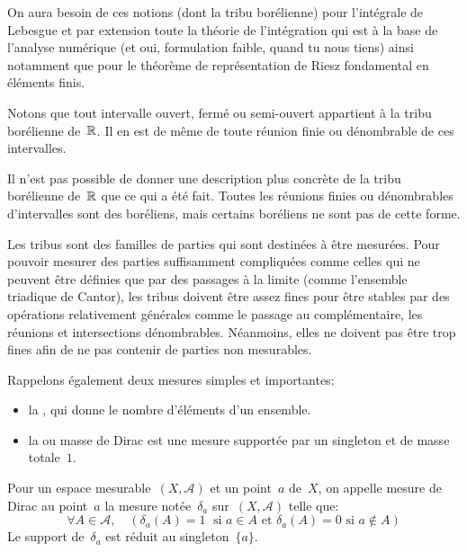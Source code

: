 On aura besoin de ces notions (dont la tribu borélienne) pour l'intégrale de Lebesgue et par extension toute la théorie de l'intégration qui est à la base de l'analyse numérique (et oui, formulation faible, quand tu nous tiens) ainsi notamment que pour le théorème de représentation de Riesz fondamental en éléments finis.

\medskip
Notons que tout intervalle ouvert, fermé ou semi-ouvert appartient à la tribu borélienne de~$\mathbb R$.
Il en est de même de toute réunion finie ou dénombrable de ces intervalles.

\medskip
Il n'est pas possible de donner une description plus concrète de la tribu borélienne de~$\mathbb R$ que ce qui a été fait. Toutes les réunions finies ou dénombrables d'intervalles sont des boréliens, mais certains boréliens ne sont pas de cette forme. 

\medskip
Les tribus sont des familles de parties qui sont destinées à être mesurées. Pour pouvoir mesurer des parties suffisamment compliquées comme celles qui ne peuvent être définies que par des passages à la limite (comme l'ensemble triadique de Cantor), les tribus doivent être assez fines pour être stables par des opérations relativement générales comme le passage au complémentaire, les réunions et intersections dénombrables. Néanmoins, elles ne doivent pas être trop fines afin de ne pas contenir de parties non mesurables.

\medskip
Rappelons également deux mesures simples et importantes:
\begin{itemize}
  \item la , qui donne le nombre d'éléments d'un ensemble.
  \item la  ou masse de Dirac est une mesure supportée par un singleton et de masse totale~$1$.
\end{itemize}

\begin{definition}
Pour un espace mesurable~$(X,\mathcal{A})$ et un point~$a$ de~$X$, on appelle mesure de Dirac au point~$a$ la mesure notée~$\delta_a$ sur~$(X, \mathcal{A})$ telle que:
\begin{equation}
  \forall A \in \mathcal{A},\quad ( \delta_a(A)=1 \; \text{ si } a \in A \text{ et } \delta_a(A)=0  \text{ si } a \notin A )
\end{equation}
Le support de~$\delta_a$ est réduit au singleton~$\{a\}$.
\end{definition}

